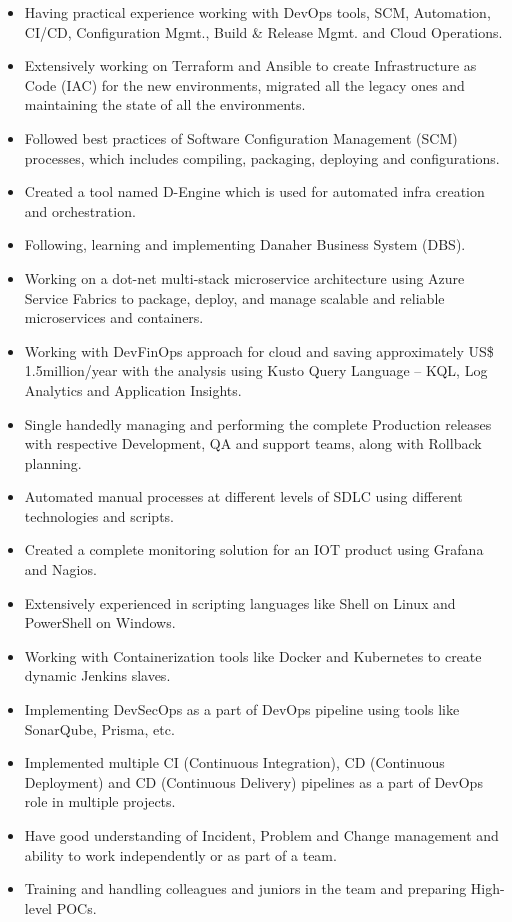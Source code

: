 \documentclass[11pt, a4paper]{article}
\begin{document}
\begin{itemize}[noitemsep, nolistsep]
\item Having practical experience working with DevOps tools, SCM, Automation, CI/CD, Configuration Mgmt., Build \& Release Mgmt. and Cloud Operations.
\item Extensively working on Terraform and Ansible to create Infrastructure as Code (IAC) for the new environments, migrated all the legacy ones and maintaining the state of all the environments.
\item Followed best practices of Software Configuration Management (SCM) processes, which includes compiling, packaging, deploying and configurations.
\item Created a tool named D-Engine which is used for automated infra creation and orchestration.
\item Following, learning and implementing Danaher Business System (DBS).
\item Working on a dot-net multi-stack microservice architecture using Azure Service Fabrics to package, deploy, and manage scalable and reliable microservices and containers.
\item Working with DevFinOps approach for cloud and saving  approximately US\$ 1.5million/year with the analysis using Kusto Query Language – KQL, Log Analytics and Application Insights.
\item Single handedly managing and performing the complete Production releases with respective Development, QA and support teams, along with Rollback planning.
\item Automated manual processes at different levels of SDLC using different technologies and scripts.
\item Created a complete monitoring solution for an IOT product using Grafana and Nagios.
\item Extensively experienced in scripting languages like Shell on Linux and PowerShell on Windows.
\item Working with Containerization tools like Docker and Kubernetes to create dynamic Jenkins slaves.
\item Implementing DevSecOps as a part of DevOps pipeline using tools like SonarQube, Prisma, etc.
\item Implemented multiple CI (Continuous Integration), CD (Continuous Deployment) and CD (Continuous Delivery) pipelines as a part of DevOps role in multiple projects.
\item Have good understanding of Incident, Problem and Change management and ability to work independently or as part of a team.
\item Training and handling colleagues and juniors in the team and preparing High-level POCs.
\end{itemize}
\end{document}
